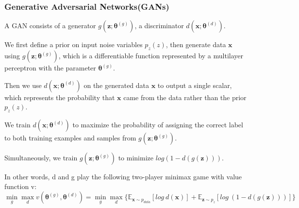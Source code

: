 \documentclass[12pt]{article}
\numberwithin{equation}{section}
\begin{document}
\subsubsection{Generative Adversarial Networks(GANs)\citep{goodfellow2014generative}}
	A GAN consists of a generator $g(\bm{z;\theta}^{(g)})$, a discriminator $d(\bm{x;\theta}^{(d)})$. \par
	We first define a prior on input noise variables $p_z(z)$, then generate data $\bm{x}$ using $g(\bm{z;\theta}^{(g)})$, which is a differentiable function represented by a multilayer perceptron with the parameter $\bm{\theta}^{(g)}$. \par
	Then we use $d(\bm{x;\theta}^{(d)})$ on the generated data $\bm{x}$ to output a single scalar, which represents the probability that $\bm{x}$ came from the data rather than the prior $p_z(z)$. \par
	We train $d(\bm{x;\theta}^{(d)})$ to maximize the probability of assigning the correct label to both training examples and samples from $g(\bm{z;\theta}^{(g)})$. \par
	Simultaneously, we train $g(\bm{z;\theta}^{(g)})$ to minimize $log(1-d(g(\bm{z})))$. \par
	In other words, d and g play the following two-player minimax game with value function v:
	\begin{equation}
		\mathop{min}_{g} \mathop{max}_{d} v(\bm{\theta}^{(g)}, \bm{\theta}^{(d)}) 
		= \mathop{min}_{g} \mathop{max}_{d}
		\{ \mathbb{E}_{\bm{x} \sim p_{data}} [log \ d(\bm{x})] + 
		\mathbb{E}_{\bm{z} \sim p_{z}} [log \ (1-d(g(\bm{z})))] \}
	\end{equation} \par
\end{document}

